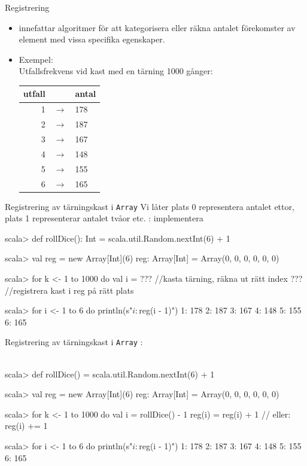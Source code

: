 


\begin{Slide}{Registrering}
\begin{itemize}
\item {} innefattar algoritmer för att kategorisera eller räkna antalet förekomster av element med vissa specifika egenskaper.

\item Exempel:
\\\vspace{0.5em}Utfallsfrekvens vid kast med en tärning 1000 gånger:

\vspace{1em}\begin{tabular}{r c l}
utfall & & antal \\ \hline
1 & $\rightarrow$ & 178 \\
2 & $\rightarrow$ & 187 \\
3 & $\rightarrow$ & 167 \\
4 & $\rightarrow$ & 148 \\
5 & $\rightarrow$ & 155 \\
6 & $\rightarrow$ & 165 \\
\end{tabular}
\end{itemize}
\end{Slide}

\begin{Slide}{Registrering av tärningskast i \texttt{Array}}
Vi låter plats 0 representera antalet ettor, plats 1 representerar antalet tvåor etc. : implementera 
\begin{REPLsmall}
scala> def rollDice(): Int = scala.util.Random.nextInt(6) + 1

scala> val reg = new Array[Int](6)
reg: Array[Int] = Array(0, 0, 0, 0, 0, 0)

scala> for k <- 1 to 1000 do 
         val i = ??? //kasta tärning, räkna ut rätt index 
         ??? //registrera kast i reg på rätt plats

scala> for i <- 1 to 6 do println(s"$i: ${reg(i - 1)}")
1: 178
2: 187
3: 167
4: 148
5: 155
6: 165
\end{REPLsmall}
\end{Slide}


\begin{Slide}{Registrering av tärningskast i \texttt{Array}}
:\\~
\begin{REPLsmall}
scala> def rollDice() = scala.util.Random.nextInt(6) + 1

scala> val reg = new Array[Int](6)
reg: Array[Int] = Array(0, 0, 0, 0, 0, 0)

scala> for k <- 1 to 1000 do
         val i = rollDice() - 1 
         reg(i) = reg(i) + 1    // eller: reg(i) += 1

scala> for i <- 1 to 6 do println(s"$i: ${reg(i - 1)}")
1: 178
2: 187
3: 167
4: 148
5: 155
6: 165
\end{REPLsmall}
\end{Slide}

